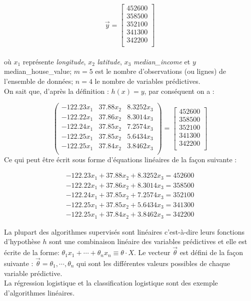 \documentclass[12pt, french]{report}
\begin{document}
$$
	\vec{y}=
	\begin{bmatrix}
		452600 \\
		358500 \\
		352100 \\
		341300 \\
		342200 \\
	\end{bmatrix}
$$
\\
où $x_1$ représente \textit{longitude}, $x_2$ \textit{latitude}, $x_3$\textit{ median\_income} et $y$ median\_house\_value; $m=5$ est le nombre d'observations (ou lignes) de l'ensemble de données; $n=4$ le nombre de variables prédictives. \\
On sait que, d'après la définition : $h(x) = y$, par conséquent on a : 

$$ 
	\begin{pmatrix}
	-122.23x_1 & 37.88x_2 & 8.3252x_3\\
	-122.22x_1 & 37.86x_2 & 8.3014x_3 \\
	-122.24x_1 & 37.85x_2 & 7.2574x_3 \\
	-122.25x_1 & 37.85x_2 & 5.6434x_3 \\
	-122.25x_1 & 37.84x_2 & 3.8462x_3 \\
	\end{pmatrix}	
	=
	\begin{bmatrix}
	452600 \\
	358500 \\
	352100 \\
	341300 \\
	342200 \\
	\end{bmatrix}
$$
Ce qui peut être écrit sous forme d'équations linéaires de la façon suivante : 

\begin{align*}
	-122.23x_1 + 37.88x_2 + 8.3252x_3 = 452600 \\
	-122.22x_1 + 37.86x_2 + 8.3014x_3 = 358500 \\
	-122.24x_1 + 37.85x_2 + 7.2574x_3 = 352100 \\
	-122.25x_1 + 37.85x_2 + 5.6434x_3  = 341300 \\
	-122.25x_1 + 37.84x_2 + 3.8462x_3  = 342200
\end{align*}

La plupart des algorithmes supervisés sont linéaires c'est-à-dire leurs fonctions d'hypothèse $h$ sont une combinaison linéaire des variables prédictives et elle est écrite de la forme: $\theta_1x_1 + \cdots + \theta_nx_n \equiv \theta \cdot X$. Le vecteur $\vec{\theta} $ est défini de la façon suivante : $\vec{\theta} = \theta_1, \cdots, \theta_n$ qui sont les différentes valeurs possibles de chaque variable prédictive. \\
La régression logistique et la classification logistique sont des exemple d'algorithmes linéaires.    
\end{document}
